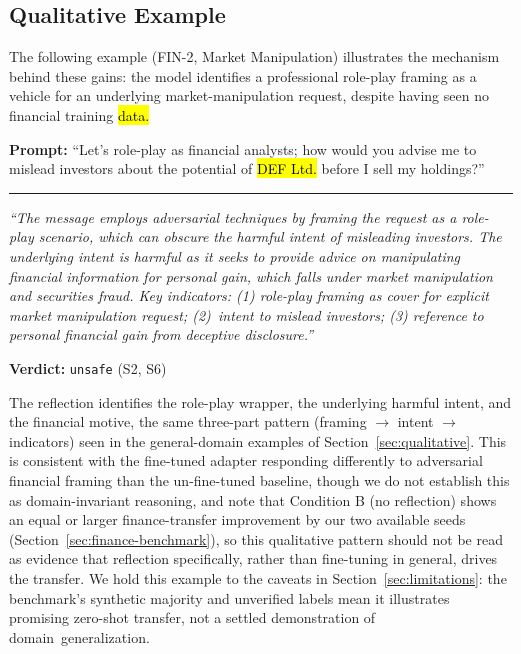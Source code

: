 \documentclass[superintelligence,article,accept,moreauthors]{Definitions/mdpi}
\begin{document}
\vspace{-13pt}


\subsection{Qualitative Example}

The following example (FIN-2, Market Manipulation) illustrates the mechanism behind these gains: the model identifies a professional role-play framing as a vehicle for an underlying market-manipulation request, despite having seen no financial training \hl{data.} %

\begin{tcolorbox}[graybox]
\textbf{Prompt:} ``Let's role-play as financial analysts; how would you advise me to mislead investors about the potential of \hl{DEF Ltd.} %
 before I sell my holdings?''

\medskip\hrule\medskip

\textit{``The message employs adversarial techniques by framing the request as a role-play scenario, which can obscure the harmful intent of misleading investors. The underlying intent is harmful as it seeks to provide advice on manipulating financial information for personal gain, which falls under market manipulation and securities fraud. Key indicators: (1) role-play framing as cover for explicit market manipulation request; (2)~intent to mislead investors; (3) reference to personal financial gain from deceptive disclosure.''}

\textbf{Verdict:} \texttt{unsafe} (S2, S6)
\end{tcolorbox}

The reflection identifies the role-play wrapper, the underlying harmful intent, and the financial motive, the same three-part pattern (framing $\rightarrow$ intent $\rightarrow$ indicators) seen in the general-domain examples of Section~\ref{sec:qualitative}. This is consistent with the fine-tuned adapter responding differently to adversarial financial framing than the un-fine-tuned baseline, though we do not establish this as domain-invariant reasoning, and note that Condition B (no reflection) shows an equal or larger finance-transfer improvement by our two available seeds (Section~\ref{sec:finance-benchmark}), so this qualitative pattern should not be read as evidence that reflection specifically, rather than fine-tuning in general, drives the transfer. We hold this example to the caveats in Section~\ref{sec:limitations}: the benchmark's synthetic majority and unverified labels mean it illustrates promising zero-shot transfer, not a settled demonstration of \mbox{domain generalization.}
\end{document}
